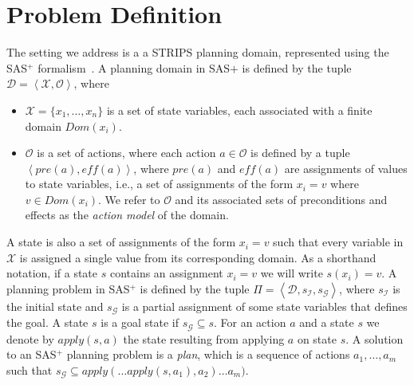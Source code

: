 \documentclass{article}
\newcommand{\tuple}[1]{\ensuremath{\left \langle #1 \right \rangle }}
\newcommand{\SAS}{SAS$^+$}
\newcommand{\eff}{\textit{eff}}
\newcommand{\pre}{\textit{pre}}
\begin{document}
	
	
	
	
	\section{Problem Definition}
	The setting we address is a a STRIPS planning domain, represented 
	using the \SAS{} formalism~\cite{backstrom1995complexity}. 
	A planning domain in SAS$+$ is defined by the tuple $\mathcal{D}=\tuple{\mathcal{X}, \mathcal{O}}$, where 
	\begin{itemize}
		\item $\mathcal{X}=\{x_1,\ldots, x_n\}$ is a set of state variables, each associated with a finite domain $Dom(x_i)$. 
		\item $\mathcal{O}$ is a set of actions, where each action $a\in \mathcal{O}$      is defined by a tuple $\tuple{\pre(a), \eff(a)}$, where $\pre(a)$ and $\eff(a)$ are assignments of values to state variables, i.e., a set of assignments of the form $x_i=v$ where $v\in Dom(x_i)$. We refer to $\mathcal{O}$ and its associated sets of preconditions and effects as the {\em action model} of the domain.
	\end{itemize}
	
	A state is also a set of assignments of the form $x_i=v$ 
	such that every variable in $\mathcal{X}$ is assigned a single value from its corresponding domain. As a shorthand notation, if a state $s$ contains an assignment $x_i=v$ we will write $s(x_i)=v$. A planning problem in \SAS{} is defined by the tuple $\Pi=\tuple{\mathcal{D},s_\mathcal{I}, s_\mathcal{G}}$, where 
	$s_\mathcal{I}$ is the initial state and $s_\mathcal{G}$ 
	is a partial assignment of some state variables that defines the goal. A state $s$ is a goal state if $s_\mathcal{G}\subseteq s$. 
	For an action $a$ and a state $s$ we denote by $apply(s,a)$ the state
	resulting from applying $a$ on state $s$. 
	A solution to an \SAS{} planning problem is a {\em plan}, 
	which is a sequence of actions $a_1,\ldots,a_m$ such that  $s_\mathcal{G}\subseteq apply(\ldots apply(s,a_1), a_2)\ldots a_m)$. 
	
\end{document}
